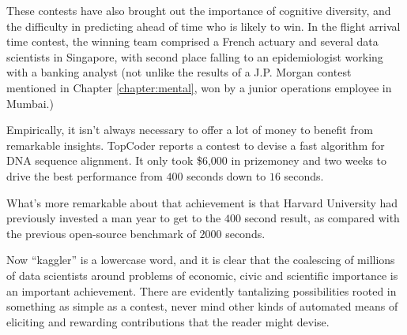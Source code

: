 These contests have also brought out the importance of cognitive diversity, and the difficulty in predicting ahead of time who is likely to win. In the flight arrival time contest, the winning team comprised a French actuary and several data scientists in Singapore, with second place falling to an epidemiologist working with a banking analyst (not unlike the results of a J.P. Morgan contest mentioned in Chapter \ref{chapter:mental}, won by a junior operations employee in Mumbai.)

Empirically, it isn't always necessary to offer a lot of money to benefit from remarkable insights. TopCoder reports a contest to devise a fast algorithm for DNA sequence alignment. It only took \$6,000 in prizemoney and two weeks to drive the best performance from $400$ seconds down to $16$ seconds. 

What's more remarkable about that achievement is that Harvard University had previously invested a man year to get to the $400$ second result, as compared with the previous open-source benchmark of $2000$ seconds.

Now ``kaggler'' is a lowercase word, and it is clear that the coalescing of millions of data scientists around problems of economic, civic and scientific importance is an important achievement. There are evidently tantalizing possibilities rooted in something as simple as a contest, never mind other kinds of automated means of eliciting and rewarding contributions that the reader might devise. 

